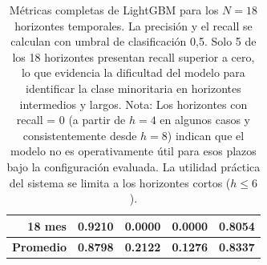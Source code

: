 \begin{table}[h!]
\begin{tabular}{|r|r|r|r|r|}
    \hline
        18 mes & 0.9210 & 0.0000 & 0.0000 & 0.8054 \\
    \hline
        \textbf{Promedio} & \textbf{0.8798} & \textbf{0.2122} & \textbf{0.1276} & \textbf{0.8337} \\
    \hline
    \end{tabular}
    \caption{Métricas completas de LightGBM para los $N=18$ horizontes temporales. La precisión y el recall se calculan con umbral de clasificación 0,5. Solo 5 de los 18 horizontes presentan recall superior a cero, lo que evidencia la dificultad del modelo para identificar la clase minoritaria en horizontes intermedios y largos. Nota: Los horizontes con recall = 0 (a partir de $ h = 4 $ en algunos casos y consistentemente desde $ h = 8 $) indican que el modelo no es operativamente útil para esos plazos bajo la configuración evaluada. La utilidad práctica del sistema se limita a los horizontes cortos ($ h \le 6 $).}
    \label{tab:lgbm_18h}
\end{table}
